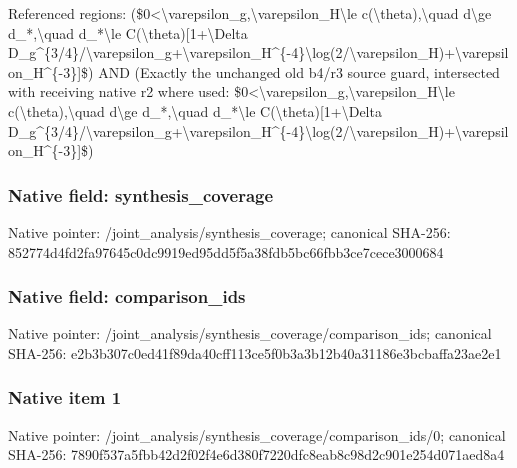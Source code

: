 \documentclass[10pt,a4paper]{article}
\begin{document}
\begingroup\raggedright\sloppy Referenced regions:\allowbreak{} (\$0<\textbackslash{}varepsilon\_\allowbreak{}g,\allowbreak{}\textbackslash{}varepsilon\_\allowbreak{}H\textbackslash{}le c(\textbackslash{}theta),\allowbreak{}\textbackslash{}quad d\textbackslash{}ge d\_\allowbreak{}*,\allowbreak{}\textbackslash{}quad d\_\allowbreak{}*\textbackslash{}le C(\textbackslash{}theta)[1+\textbackslash{}Delta D\_\allowbreak{}g\textasciicircum{}\{3/\allowbreak{}4\}/\allowbreak{}\textbackslash{}varepsilon\_\allowbreak{}g+\textbackslash{}varepsilon\_\allowbreak{}H\textasciicircum{}\{-4\}\textbackslash{}log(2/\allowbreak{}\textbackslash{}varepsilon\_\allowbreak{}H)+\textbackslash{}varepsilon\_\allowbreak{}H\textasciicircum{}\{-3\}]\$) AND (Exactly the unchanged old b4/\allowbreak{}r3 source guard,\allowbreak{} intersected with receiving native r2 where used:\allowbreak{} \$0<\textbackslash{}varepsilon\_\allowbreak{}g,\allowbreak{}\textbackslash{}varepsilon\_\allowbreak{}H\textbackslash{}le c(\textbackslash{}theta),\allowbreak{}\textbackslash{}quad d\textbackslash{}ge d\_\allowbreak{}*,\allowbreak{}\textbackslash{}quad d\_\allowbreak{}*\textbackslash{}le C(\textbackslash{}theta)[1+\textbackslash{}Delta D\_\allowbreak{}g\textasciicircum{}\{3/\allowbreak{}4\}/\allowbreak{}\textbackslash{}varepsilon\_\allowbreak{}g+\textbackslash{}varepsilon\_\allowbreak{}H\textasciicircum{}\{-4\}\textbackslash{}log(2/\allowbreak{}\textbackslash{}varepsilon\_\allowbreak{}H)+\textbackslash{}varepsilon\_\allowbreak{}H\textasciicircum{}\{-3\}]\$)\par\endgroup

\subsubsection{Native field: synthesis\_\allowbreak{}coverage}
Native pointer: /joint\_\allowbreak{}analysis/synthesis\_\allowbreak{}coverage; canonical SHA-256: 852774d4fd2fa97645c0dc9919ed95dd5f5a38fdb5bc66fbb3ce7cece3000684

\subsubsection{Native field: comparison\_\allowbreak{}ids}
Native pointer: /joint\_\allowbreak{}analysis/synthesis\_\allowbreak{}coverage/comparison\_\allowbreak{}ids; canonical SHA-256: e2b3b307c0ed41f89da40cff113ce5f0b3a3b12b40a31186e3bcbaffa23ae2e1

\subsubsection{Native item 1}
Native pointer: /joint\_\allowbreak{}analysis/synthesis\_\allowbreak{}coverage/comparison\_\allowbreak{}ids/0; canonical SHA-256: 7890f537a5fbb42d2f02f4e6d380f7220dfc8eab8c98d2c901e254d071aed8a4
\end{document}

